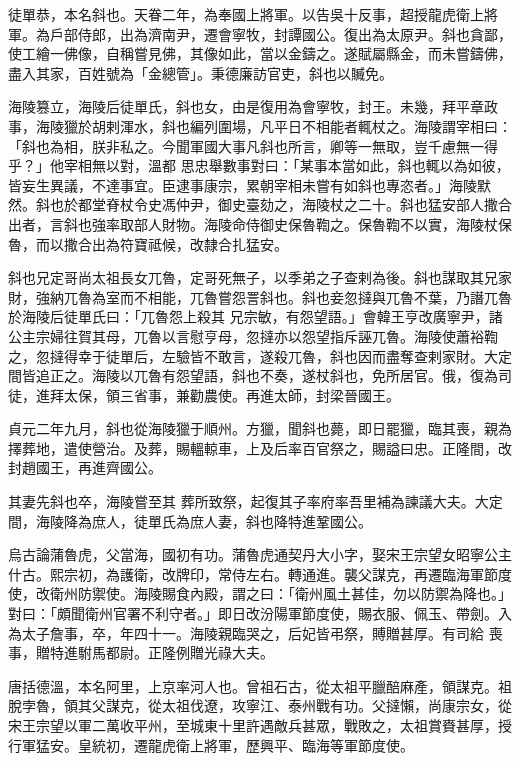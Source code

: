 \begin{pinyinscope}
 徒單恭，本名斜也。天眷二年，為奉國上將軍。以告吳十反事，超授龍虎衛上將軍。為戶部侍郎，出為濟南尹，遷會寧牧，封譚國公。復出為太原尹。斜也貪鄙，使工繪一佛像，自稱嘗見佛，其像如此，當以金鑄之。遂賦屬縣金，而未嘗鑄佛，盡入其家，百姓號為「金總管」。秉德廉訪官吏，斜也以贓免。



 海陵篡立，海陵后徒單氏，斜也女，由是復用為會寧牧，封王。未幾，拜平章政事，海陵獵於胡剌渾水，斜也編列圍場，凡平日不相能者輒杖之。海陵謂宰相曰：「斜也為相，朕非私之。今聞軍國大事凡斜也所言，卿等一無取，豈千慮無一得乎？」他宰相無以對，溫都
 思忠舉數事對曰：「某事本當如此，斜也輒以為如彼，皆妄生異議，不達事宜。臣逮事康宗，累朝宰相未嘗有如斜也專恣者。」海陵默然。斜也於都堂脊杖令史馮仲尹，御史臺劾之，海陵杖之二十。斜也猛安部人撒合出者，言斜也強率取部人財物。海陵命侍御史保魯鞫之。保魯鞫不以實，海陵杖保魯，而以撒合出為符寶祗候，改隸合扎猛安。



 斜也兄定哥尚太祖長女兀魯，定哥死無子，以季弟之子查剌為後。斜也謀取其兄家財，強納兀魯為室而不相能，兀魯嘗怨詈斜也。斜也妾忽撻與兀魯不葉，乃譖兀魯於海陵后徒單氏曰：「兀魯怨上殺其
 兄宗敏，有怨望語。」會韓王亨改廣寧尹，諸公主宗婦往賀其母，兀魯以言慰亨母，忽撻亦以怨望指斥誣兀魯。海陵使蕭裕鞫之，忽撻得幸于徒單后，左驗皆不敢言，遂殺兀魯，斜也因而盡奪查剌家財。大定間皆追正之。海陵以兀魯有怨望語，斜也不奏，遂杖斜也，免所居官。俄，復為司徒，進拜太保，領三省事，兼勸農使。再進太師，封梁晉國王。



 貞元二年九月，斜也從海陵獵于順州。方獵，聞斜也薨，即日罷獵，臨其喪，親為擇葬地，遣使營治。及葬，賜轀輬車，上及后率百官祭之，賜謚曰忠。正隆間，改封趙國王，再進齊國公。



 其妻先斜也卒，海陵嘗至其
 葬所致祭，起復其子率府率吾里補為諫議大夫。大定間，海陵降為庶人，徒單氏為庶人妻，斜也降特進鞏國公。



 烏古論蒲魯虎，父當海，國初有功。蒲魯虎通契丹大小字，娶宋王宗望女昭寧公主什古。熙宗初，為護衛，改牌印，常侍左右。轉通進。襲父謀克，再遷臨海軍節度使，改衛州防禦使。海陵賜食內殿，謂之曰：「衛州風土甚佳，勿以防禦為降也。」對曰：「頗聞衛州官署不利守者。」即日改汾陽軍節度使，賜衣服、佩玉、帶劍。入為太子詹事，卒，年四十一。海陵親臨哭之，后妃皆弔祭，賻贈甚厚。有司給
 喪事，贈特進駙馬都尉。正隆例贈光祿大夫。



 唐括德溫，本名阿里，上京率河人也。曾祖石古，從太祖平臘醅麻產，領謀克。祖脫孛魯，領其父謀克，從太祖伐遼，攻寧江、泰州戰有功。父撻懶，尚康宗女，從宋王宗望以軍二萬收平州，至城東十里許遇敵兵甚眾，戰敗之，太祖賞賚甚厚，授行軍猛安。皇統初，遷龍虎衛上將軍，歷興平、臨海等軍節度使。




\end{pinyinscope}

